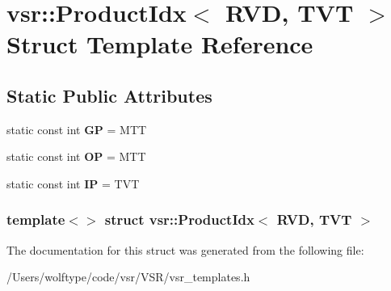 \hypertarget{structvsr_1_1_product_idx_3_01_r_v_d_00_01_t_v_t_01_4}{\section{vsr\-:\-:Product\-Idx$<$ R\-V\-D, T\-V\-T $>$ Struct Template Reference}
\label{structvsr_1_1_product_idx_3_01_r_v_d_00_01_t_v_t_01_4}
}
\subsection*{Static Public Attributes}
\begin{DoxyCompactItemize}
\item 
\hypertarget{structvsr_1_1_product_idx_3_01_r_v_d_00_01_t_v_t_01_4_a945d5a39e26adad6654b8bfd25a09fd4}{static const int {\bfseries G\-P} = M\-T\-T}\label{structvsr_1_1_product_idx_3_01_r_v_d_00_01_t_v_t_01_4_a945d5a39e26adad6654b8bfd25a09fd4}

\item 
\hypertarget{structvsr_1_1_product_idx_3_01_r_v_d_00_01_t_v_t_01_4_a5c9f8a6f69523c7c902ede0104f5ab75}{static const int {\bfseries O\-P} = M\-T\-T}\label{structvsr_1_1_product_idx_3_01_r_v_d_00_01_t_v_t_01_4_a5c9f8a6f69523c7c902ede0104f5ab75}

\item 
\hypertarget{structvsr_1_1_product_idx_3_01_r_v_d_00_01_t_v_t_01_4_a24235713a96759c4c2ba36cd2ca1acd2}{static const int {\bfseries I\-P} = T\-V\-T}\label{structvsr_1_1_product_idx_3_01_r_v_d_00_01_t_v_t_01_4_a24235713a96759c4c2ba36cd2ca1acd2}

\end{DoxyCompactItemize}
\subsubsection*{template$<$$>$ struct vsr\-::\-Product\-Idx$<$ R\-V\-D, T\-V\-T $>$}



The documentation for this struct was generated from the following file\-:\begin{DoxyCompactItemize}
\item 
/\-Users/wolftype/code/vsr/\-V\-S\-R/vsr\-\_\-templates.\-h\end{DoxyCompactItemize}
